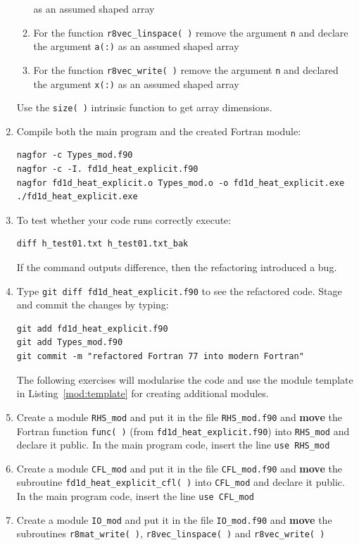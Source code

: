 \documentclass[12pt]{article}
\begin{document}
\begin{enumerate}
\begin{enumerate}
as an assumed shaped array
\item For the function \texttt{r8vec\_linspace( )} remove the argument \texttt{n} and declare the argument \texttt{a(:)} as
an assumed shaped array
\item For the function \texttt{r8vec\_write( )} remove the argument \texttt{n} and declared the argument \texttt{x(:)} as
an assumed shaped array
\end{enumerate}
Use the \texttt{size( )} intrinsic function to get array dimensions. 
\item Compile both the main program and the created Fortran module:
\begin{verbatim}
nagfor -c Types_mod.f90
nagfor -c -I. fd1d_heat_explicit.f90
nagfor fd1d_heat_explicit.o Types_mod.o -o fd1d_heat_explicit.exe
./fd1d_heat_explicit.exe
\end{verbatim}
\item To test whether your code runs correctly execute:
\begin{verbatim}
diff h_test01.txt h_test01.txt_bak
\end{verbatim}
If the command outputs difference, then the refactoring introduced a bug.
\item Type \texttt{git diff fd1d\_heat\_explicit.f90} to see the refactored code. Stage and commit
the changes by typing: 
\begin{verbatim}
git add fd1d_heat_explicit.f90
git add Types_mod.f90
git commit -m "refactored Fortran 77 into modern Fortran"
\end{verbatim}
The following exercises will modularise the code and use the module template in
  Listing~\ref{mod:template} for creating additional modules.
\item Create a module \texttt{RHS\_mod} and put it in the file \texttt{RHS\_mod.f90} and {\bf move} the 
Fortran function \texttt{func( )} (from \texttt{fd1d\_heat\_explicit.f90}) into \texttt{RHS\_mod} and declare it public. In the main program code, 
insert the line \texttt{use RHS\_mod} 
\item Create a module \texttt{CFL\_mod} and put it in the file \texttt{CFL\_mod.f90} and {\bf move} the
  subroutine \texttt{fd1d\_heat\_explicit\_cfl( )} into \texttt{CFL\_mod} and declare it
  public. In the main program
code, insert the line \texttt{use CFL\_mod}
\item Create a module \texttt{IO\_mod} and put it in the file \texttt{IO\_mod.f90} and {\bf move}
  the subroutines \texttt{r8mat\_write( )}, \texttt{r8vec\_linspace( )} and \texttt{r8vec\_write( )}

\end{enumerate}
\end{document}
